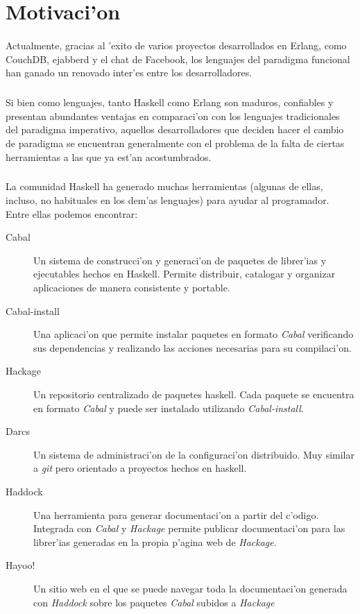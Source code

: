 \documentclass[a4paper]{article}
\begin{document}
\newpage
\tableofcontents

\newpage
\section{Motivaci'on}

\paragraph{}Actualmente, gracias al 'exito de varios proyectos desarrollados en Erlang, como CouchDB, ejabberd y el chat de Facebook, los lenguajes del paradigma funcional han ganado un renovado inter'es entre los desarrolladores.
\subparagraph{}Si bien como lenguajes, tanto Haskell como Erlang son maduros, confiables y presentan abundantes ventajas en comparaci'on con los lenguajes tradicionales del paradigma imperativo, aquellos desarrolladores que deciden hacer el cambio de paradigma se encuentran generalmente con el problema de la falta de ciertas herramientas a las que ya est'an acostumbrados.
\subparagraph{}La comunidad Haskell ha generado muchas herramientas (algunas de ellas, incluso, no habituales en los dem'as lenguajes) para ayudar al programador.  Entre ellas podemos encontrar:
\begin{description}
\item[Cabal] Un sistema de construcci'on y generaci'on de paquetes de librer'ias y ejecutables hechos en Haskell.  Permite distribuir, catalogar y organizar aplicaciones de manera consistente y portable.
\item[Cabal-install] Una aplicaci'on que permite instalar paquetes en formato \textsl{Cabal} verificando sus dependencias y realizando las acciones necesarias para su compilaci'on.
\item[Hackage] Un repositorio centralizado de paquetes haskell.  Cada paquete se encuentra en formato \textsl{Cabal} y puede ser instalado utilizando \textsl{Cabal-install}.
\item[Darcs] Un sistema de administraci'on de la configuraci'on distribuido.  Muy similar a \textsl{git} pero orientado a proyectos hechos en haskell.
\item[Haddock] Una herramienta para generar documentaci'on a partir del c'odigo.  Integrada con \textsl{Cabal} y \textsl{Hackage} permite publicar documentaci'on para las librer'ias generadas en la propia p'agina web de \textsl{Hackage}.
\item[Hayoo!] Un sitio web en el que se puede navegar toda la documentaci'on generada con \textsl{Haddock} sobre los paquetes \textsl{Cabal} subidos a \textsl{Hackage}
\end{description}
\end{document}
